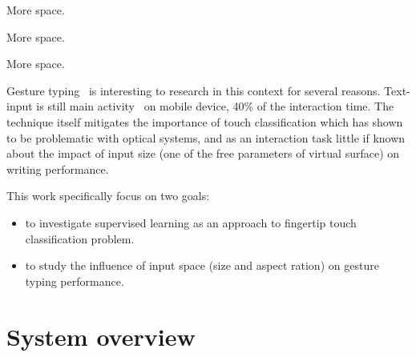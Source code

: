 \documentclass{chi-ext}
\begin{document}
More space.

More space.

More space.


Gesture typing~\cite{Kristensson2004} is interesting to research in this context for several reasons. Text-input is still main activity~\cite{McGregor2014} on mobile device, 40\% of the interaction time. The technique itself mitigates the importance of touch classification which has shown to be problematic with optical systems, and as an interaction task little if known about the impact of input size (one of the free parameters of virtual surface) on writing performance.




This work specifically focus on two goals:
\begin{itemize}
\item to investigate supervised learning as an approach to fingertip touch classification problem.
\item to study the influence of input space (size and aspect ration) on gesture typing performance.
\end{itemize}

\section{System overview}
\end{document}
